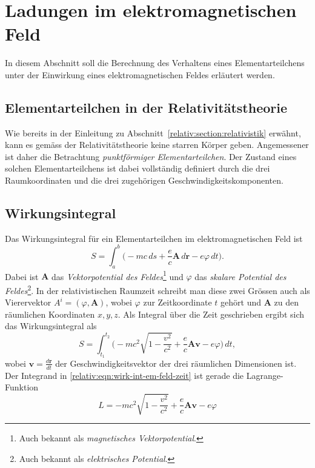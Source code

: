 
\section{Ladungen im elektromagnetischen Feld
\label{relativ:section:em_feld}}

In diesem Abschnitt soll die Berechnung des Verhaltens eines Elementarteilchens
unter der Einwirkung eines elektromagnetischen Feldes erläutert werden.


\subsection{Elementarteilchen in der Relativitätstheorie
\label{relativ:section:elementarteilchen}}

Wie bereits in der Einleitung zu Abschnitt~\ref{relativ:section:relativistik} erwähnt,
kann es gemäss der Relativitätstheorie keine starren Körper geben.
Angemessener ist daher die Betrachtung \emph{punktförmiger Elementarteilchen}.
Der Zustand eines solchen Elementarteilchens ist dabei vollständig definiert durch
die drei Raumkoordinaten und die drei zugehörigen Geschwindigkeitskomponenten.


\subsection{Wirkungsintegral
\label{relativ:section:wirkungsintegral}}

Das Wirkungsintegral für ein Elementarteilchen im elektromagnetischen Feld ist
\begin{equation}
    S = \int_a^b \biggl(-mc\,ds + \frac{e}{c} \bm{A}\,d\bm{r} - e\varphi\,dt\biggr).
    \label{relativ:eqn:wirk-int-em-feld}
\end{equation}
Dabei ist \(\bm{A}\) das \emph{Vektorpotential des Feldes}\footnote{
    Auch bekannt als \emph{magnetisches Vektorpotential}.}
und \(\varphi\) das \emph{skalare Potential des Feldes}\footnote{
    Auch bekannt als \emph{elektrisches Potential}.}.
In der relativistischen Raumzeit schreibt man diese zwei Grössen
auch als Vierervektor \(A^i = (\varphi, \bm{A})\),
wobei \(\varphi\) zur Zeitkoordinate \(t\) gehört und
\(\bm{A}\) zu den räumlichen Koordinaten \(x, y, z\).
Als Integral über die Zeit geschrieben ergibt sich das Wirkungsintegral als
\begin{equation}
    S = \int_{t_1}^{t_2} \biggl( -mc^2 \sqrt{1-\frac{v^2}{c^2}} + \frac{e}{c} \bm{A} \bm{v} - e \varphi \biggr) \, dt,
    \label{relativ:eqn:wirk-int-em-feld-zeit}
\end{equation}
wobei \(\displaystyle \bm{v} = \frac{d\bm{r}}{dt}\) der Geschwindigkeitsvektor der drei räumlichen Dimensionen ist.
Der Integrand in \eqref{relativ:eqn:wirk-int-em-feld-zeit} ist gerade die Lagrange-Funktion
\begin{equation}
    L = -mc^2 \sqrt{1-\frac{v^2}{c^2}} + \frac{e}{c} \bm{A} \bm{v} - e \varphi
    \label{relativ:eqn:lagrange-em-feld}
\end{equation}


